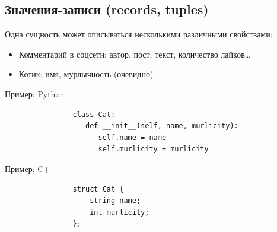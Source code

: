     \subsection{Значения-записи (records, tuples)}

    \begin{frame}[fragile]{\subsecname}
        Одна сущность может описываться несколькими различными свойствами:
        \begin{itemize}
            \item Комментарий в соцсети: автор, пост, текст, количество лайков\ldots
            \item Котик: имя, мурлычность (очевидно)
        \end{itemize}
        \begin{block}{Пример: Python}
            \begin{verbatim}
                class Cat:
                   def __init__(self, name, murlicity):
                      self.name = name
                      self.murlicity = murlicity
            \end{verbatim}
        \end{block}
        \begin{block}{Пример: C++}
            \begin{verbatim}
                struct Cat {
                    string name;
                    int murlicity;
                };
            \end{verbatim}
        \end{block}
    \end{frame}

